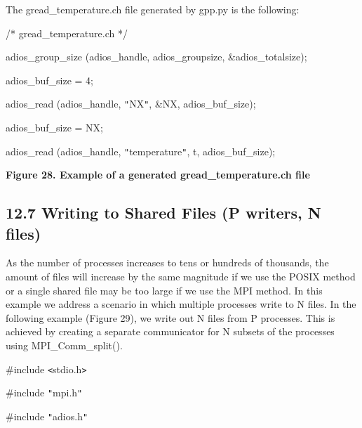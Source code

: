 \vspace{10pt}
The gread\_temperature.ch file generated by gpp.py is the following:

\vspace{22pt}
/* gread\_temperature.ch */

\vspace{10pt}
adios\_group\_size (adios\_handle, adios\_groupsize, \&adios\_totalsize);

\vspace{10pt}
adios\_buf\_size = 4;

\vspace{10pt}
adios\_read (adios\_handle, \texttt{"}NX\texttt{"}, \&NX, adios\_buf\_size);

\vspace{10pt}
adios\_buf\_size = NX;

\vspace{10pt}
adios\_read (adios\_handle, \texttt{"}temperature\texttt{"}, t, adios\_buf\_size);

\label{HToc144350187}

\vspace{22pt}
\leftskip=18pt
{\color{color20} \textbf{Figure 28. Example of a generated gread\_temperature.ch 
file\label{HToc182553446}}}

\vspace{10pt}
\subsection*{{\large 12.7 }{\large \textbf{Writing to Shared Files (P writers, 
N files)}}}

\vspace{10pt}
\leftskip=0pt
As the number of processes increases to tens or hundreds of thousands, the amount 
of files will increase by the same magnitude if we use the POSIX method or a single 
shared file may be too large if we use the MPI method. In this example we address 
a scenario in which multiple processes write to N files. In the following example 
(Figure 29), we write out N files from P processes. This is achieved by creating 
a separate communicator for N subsets of the processes using MPI\_Comm\_split(). 

\vspace{22pt}
\#include \texttt{<}stdio.h\texttt{>}

\vspace{10pt}
\#include \texttt{"}mpi.h\texttt{"}

\vspace{10pt}
\#include \texttt{"}adios.h\texttt{"}

